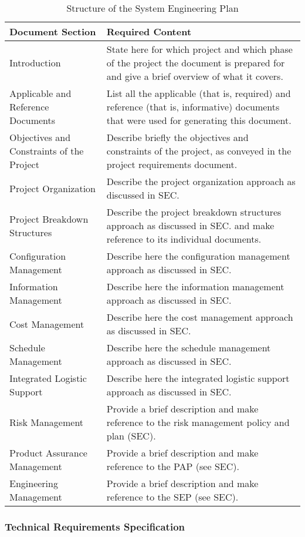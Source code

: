 \begin{table}[h]
\centering
\begin{tabular}{l p{7cm}}
\toprule
\textbf{Document Section} & \textbf{Required Content} \\
\midrule
Introduction & State here for which project and which phase of the project the document is prepared for and give a brief overview of what it covers. \\
Applicable and Reference Documents & List all the applicable (that is, required) and reference (that is, informative) documents that were used for generating this document. \\
Objectives and Constraints of the Project & Describe briefly the objectives and constraints of the project, as conveyed in the project requirements document. \\
Project Organization & Describe the project organization approach as discussed in SEC. \\
Project Breakdown Structures & Describe the project breakdown structures approach as discussed in SEC. and make reference to its individual documents. \\
Configuration Management & Describe here the configuration management approach as discussed in SEC.\\
Information Management & Describe here the information management approach as discussed in SEC.\\
Cost Management & Describe here the cost management approach as discussed in SEC.\\
Schedule Management & Describe here the schedule management approach as discussed in SEC.\\
Integrated Logistic Support & Describe here the integrated logistic support approach as discussed in SEC. \\
Risk Management & Provide a brief description and make reference to the risk management policy and plan (SEC). \\
Product Assurance Management & Provide a brief description and make reference to the PAP (see SEC). \\
Engineering Management & Provide a brief description and make reference to the SEP (see SEC). \\
\bottomrule
\end{tabular}
\caption{Structure of the System Engineering Plan}
\end{table}

\clearpage
\subsubsection{Technical Requirements Specification}
\label{app:Technical Requirements Specification}

